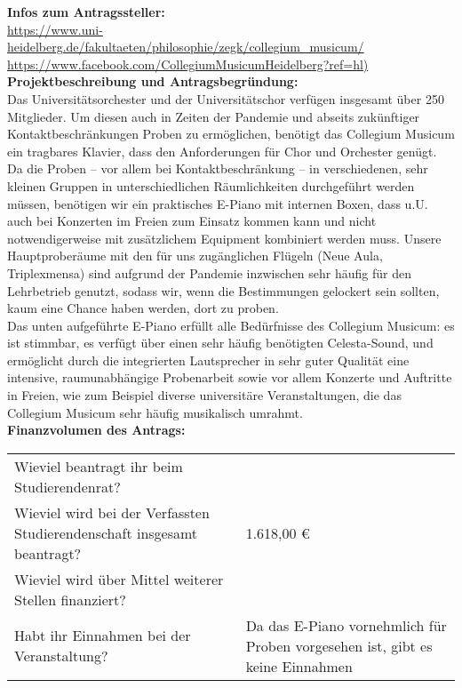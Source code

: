 {
    \textbf{Infos zum Antragssteller:}\\
    \url{https://www.uni-heidelberg.de/fakultaeten/philosophie/zegk/collegium_musicum/}\\
    \url{https://www.facebook.com/CollegiumMusicumHeidelberg?ref=hl)}\\[1em]
    \textbf{Projektbeschreibung und Antragsbegründung:}\\
    Das Universitätsorchester und der Universitätschor verfügen insgesamt über 250 Mitglieder. Um diesen auch in Zeiten der Pandemie und abseits zukünftiger Kontaktbeschränkungen Proben zu ermöglichen, benötigt das Collegium Musicum ein tragbares Klavier, dass den Anforderungen für Chor und Orchester genügt. Da die Proben – vor allem bei Kontaktbeschränkung – in verschiedenen, sehr kleinen Gruppen in unterschiedlichen Räumlichkeiten durchgeführt werden müssen, benötigen wir ein praktisches E-Piano mit internen Boxen, dass u.U. auch bei Konzerten im Freien zum Einsatz kommen kann und nicht notwendigerweise mit zusätzlichem Equipment kombiniert werden muss. Unsere Hauptproberäume mit den für uns zugänglichen Flügeln (Neue Aula, Triplexmensa) sind aufgrund der Pandemie inzwischen sehr häufig für den Lehrbetrieb genutzt, sodass wir, wenn die Bestimmungen gelockert sein sollten, kaum eine Chance haben werden, dort zu proben.\\
    Das unten aufgeführte E-Piano erfüllt alle Bedürfnisse des Collegium Musicum: es ist stimmbar, es verfügt über einen sehr häufig benötigten Celesta-Sound, und ermöglicht durch die integrierten Lautsprecher in sehr guter Qualität eine intensive, raumunabhängige Probenarbeit sowie vor allem Konzerte und Auftritte in Freien, wie zum Beispiel diverse universitäre Veranstaltungen, die das Collegium Musicum sehr häufig musikalisch umrahmt.\\[1em]
    \textbf{Finanzvolumen des Antrags:}\\
    \newline
    \begin{tabular}{p{11cm} p{4cm}}
        Wieviel beantragt ihr beim Studierendenrat?                             &         \\
        Wieviel wird bei der Verfassten Studierendenschaft insgesamt beantragt? & 1.618,00 €    \\
        Wieviel wird über Mittel weiterer Stellen finanziert?                   &           \\
        Habt ihr Einnahmen bei der Veranstaltung?                               & Da das E-Piano vornehmlich für Proben vorgesehen ist, gibt es keine Einnahmen                      \\

\end{tabular}}
